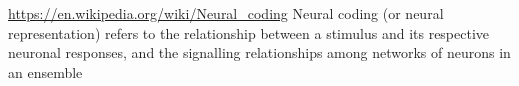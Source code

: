 \documentclass[a4paper]{standalone}
\begin{document}
    \url{https://en.wikipedia.org/wiki/Neural_coding}
    Neural coding (or neural representation) refers to the relationship between a stimulus and its respective neuronal responses, and the signalling relationships among networks of neurons in an ensemble
\end{document}
